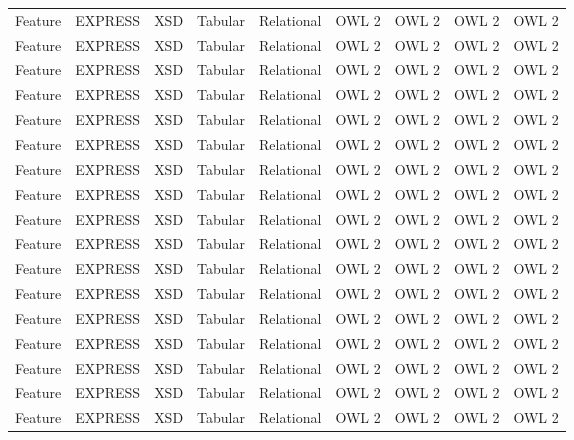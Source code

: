 \begin{table*}[t]
\begin{tabularx}{\textwidth}{XXXXXXXXX}
            Feature & EXPRESS   &   XSD &  Tabular  & Relational    &   OWL 2  & OWL 2 &    OWL 2   &   OWL 2 \\
            Feature & EXPRESS   &   XSD &  Tabular  & Relational    &   OWL 2  & OWL 2 &    OWL 2   &   OWL 2 \\
            Feature & EXPRESS   &   XSD &  Tabular  & Relational    &   OWL 2  & OWL 2 &    OWL 2   &   OWL 2 \\
            Feature & EXPRESS   &   XSD &  Tabular  & Relational    &   OWL 2  & OWL 2 &    OWL 2   &   OWL 2 \\
            Feature & EXPRESS   &   XSD &  Tabular  & Relational    &   OWL 2  & OWL 2 &    OWL 2   &   OWL 2 \\
            Feature & EXPRESS   &   XSD &  Tabular  & Relational    &   OWL 2  & OWL 2 &    OWL 2   &   OWL 2 \\
            Feature & EXPRESS   &   XSD &  Tabular  & Relational    &   OWL 2  & OWL 2 &    OWL 2   &   OWL 2 \\
            Feature & EXPRESS   &   XSD &  Tabular  & Relational    &   OWL 2  & OWL 2 &    OWL 2   &   OWL 2 \\
            Feature & EXPRESS   &   XSD &  Tabular  & Relational    &   OWL 2  & OWL 2 &    OWL 2   &   OWL 2 \\
            Feature & EXPRESS   &   XSD &  Tabular  & Relational    &   OWL 2  & OWL 2 &    OWL 2   &   OWL 2 \\
            Feature & EXPRESS   &   XSD &  Tabular  & Relational    &   OWL 2  & OWL 2 &    OWL 2   &   OWL 2 \\
            Feature & EXPRESS   &   XSD &  Tabular  & Relational    &   OWL 2  & OWL 2 &    OWL 2   &   OWL 2 \\
            Feature & EXPRESS   &   XSD &  Tabular  & Relational    &   OWL 2  & OWL 2 &    OWL 2   &   OWL 2 \\
            Feature & EXPRESS   &   XSD &  Tabular  & Relational    &   OWL 2  & OWL 2 &    OWL 2   &   OWL 2 \\
            Feature & EXPRESS   &   XSD &  Tabular  & Relational    &   OWL 2  & OWL 2 &    OWL 2   &   OWL 2 \\
            Feature & EXPRESS   &   XSD &  Tabular  & Relational    &   OWL 2  & OWL 2 &    OWL 2   &   OWL 2 \\
            Feature & EXPRESS   &   XSD &  Tabular  & Relational    &   OWL 2  & OWL 2 &    OWL 2   &   OWL 2 \\

\end{tabularx}
\end{table*}
